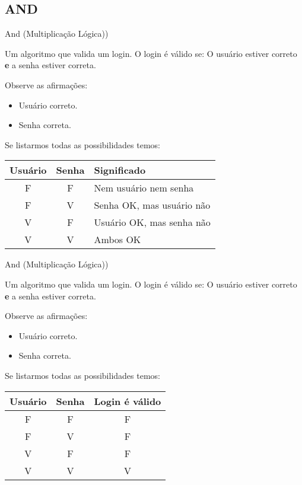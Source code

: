 \subsection{AND}

\begin{frame}{And (Multiplicação Lógica))} 

	Um algoritmo que valida um login. O login é válido se: O usuário estiver correto \textbf{e} a senha estiver correta.

	Observe as afirmações:

	\vspace{0.2cm}
	\begin{itemize}
		\item Usuário correto.
		\item Senha correta.
	\end{itemize}

	Se listarmos todas as possibilidades temos:

		\center 
		\vspace{0.4cm}

		\begin{tabular}{|c|c|l|} \hline 
			\textbf{Usuário} & \textbf{Senha} & \textbf{ Significado } \\ \hline 
			F & F & Nem usuário nem senha \\ \hline 
			F & V & Senha OK, mas usuário não \\ \hline 
			V & F & Usuário OK, mas senha não \\ \hline
			V & V & Ambos OK \\ \hline 
		\end{tabular} 

\end{frame}


\begin{frame}{And (Multiplicação Lógica))} 

	Um algoritmo que valida um login. O login é válido se: O usuário estiver correto \textbf{e} a senha estiver correta.

	Observe as afirmações:

	\vspace{0.2cm}
	\begin{itemize}
		\item Usuário correto.
		\item Senha correta.
	\end{itemize}

	Se listarmos todas as possibilidades temos:

		\center 
		\vspace{0.4cm}

		\begin{tabular}{|c|c|c|} \hline 
			\textbf{Usuário} & \textbf{Senha} & \textbf{Login é válido} \\ \hline 
			F & F & F \\ \hline 
			F & V & F \\ \hline 
			V & F & F \\ \hline 
			V & V & V \\ \hline 
		\end{tabular} 

\end{frame}



